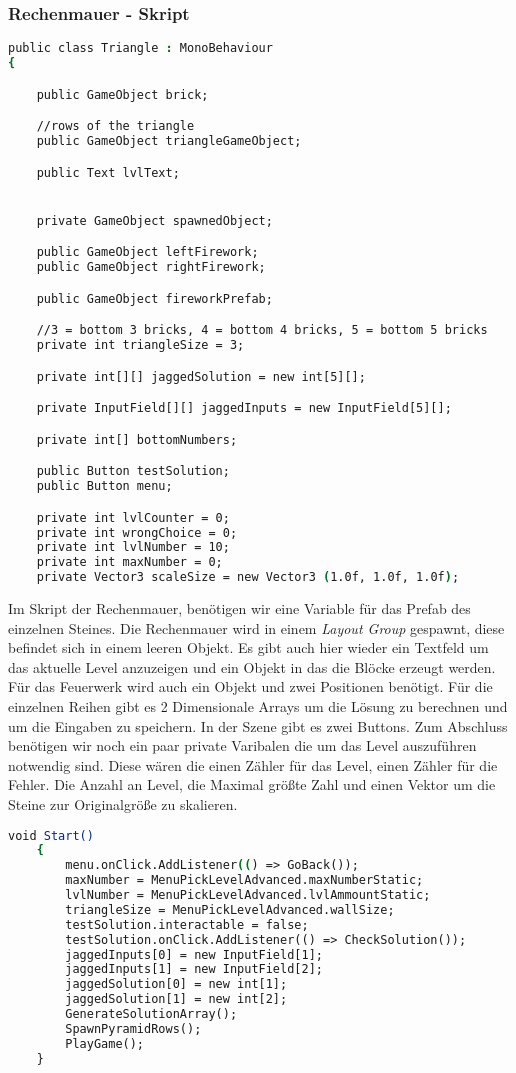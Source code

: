 \subsubsection{Rechenmauer - Skript}
\begin{lstlisting}[language=csh, caption={Triangle.cs Variablen Deklaration}]
public class Triangle : MonoBehaviour
{

	public GameObject brick;

	//rows of the triangle
	public GameObject triangleGameObject;

	public Text lvlText;


	private GameObject spawnedObject;

	public GameObject leftFirework;
	public GameObject rightFirework;

	public GameObject fireworkPrefab;

	//3 = bottom 3 bricks, 4 = bottom 4 bricks, 5 = bottom 5 bricks
	private int triangleSize = 3;

	private int[][] jaggedSolution = new int[5][];

	private InputField[][] jaggedInputs = new InputField[5][];

	private int[] bottomNumbers;

	public Button testSolution;
	public Button menu;

	private int lvlCounter = 0;
	private int wrongChoice = 0;
	private int lvlNumber = 10;
	private int maxNumber = 0;
	private Vector3 scaleSize = new Vector3 (1.0f, 1.0f, 1.0f);
\end{lstlisting}
Im Skript der Rechenmauer, benötigen wir eine Variable für das Prefab des einzelnen Steines. Die Rechenmauer wird in einem \textit{Layout Group} gespawnt, diese befindet sich in einem leeren Objekt. Es gibt auch hier wieder ein Textfeld um das aktuelle Level anzuzeigen und ein Objekt in das die Blöcke erzeugt werden. Für das Feuerwerk wird auch ein Objekt und zwei Positionen benötigt. Für die einzelnen Reihen gibt es 2 Dimensionale Arrays um die Lösung zu berechnen und um die Eingaben zu speichern. In der Szene gibt es zwei Buttons. Zum Abschluss benötigen wir noch ein paar private Varibalen die um das Level auszuführen notwendig sind. Diese wären die einen Zähler für das Level, einen Zähler für die Fehler. Die Anzahl an Level, die Maximal größte Zahl und einen Vektor um die Steine zur Originalgröße zu skalieren.\\
\begin{lstlisting}[language=csh, caption={Triangle.cs Start-Funktion}]
	void Start()
	{
		menu.onClick.AddListener(() => GoBack());
		maxNumber = MenuPickLevelAdvanced.maxNumberStatic;
		lvlNumber = MenuPickLevelAdvanced.lvlAmmountStatic;
		triangleSize = MenuPickLevelAdvanced.wallSize;
		testSolution.interactable = false;
		testSolution.onClick.AddListener(() => CheckSolution());
		jaggedInputs[0] = new InputField[1];
		jaggedInputs[1] = new InputField[2];
		jaggedSolution[0] = new int[1];
		jaggedSolution[1] = new int[2];
		GenerateSolutionArray();
		SpawnPyramidRows();
		PlayGame();
	}
\end{lstlisting}
